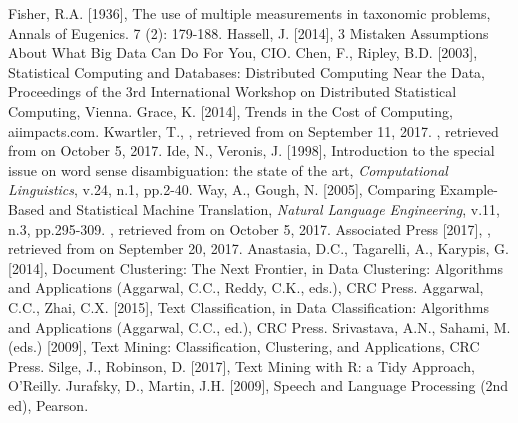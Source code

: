 \begin{thebibliography}{99}
 
 Fisher, R.A. [1936], The use of multiple measurements in taxonomic problems, Annals of Eugenics. 7 (2): 179-188.
 Hassell, J. [2014], 3 Mistaken Assumptions About What Big Data Can Do For You, CIO.
 Chen, F., Ripley, B.D. [2003], Statistical Computing and Databases: Distributed Computing Near the Data, Proceedings of the 3rd International Workshop on Distributed Statistical Computing, Vienna. 
 Grace, K. [2014], Trends in the Cost of Computing, aiimpacts.com.
 Kwartler, T., , retrieved from  on September 11, 2017. 
 , retrieved from  on October 5, 2017.
 Ide, N., Veronis, J. [1998], Introduction to the special issue on word sense disambiguation: the state of the art, \textit{Computational Linguistics}, v.24, n.1, pp.2-40.
 Way, A., Gough, N. [2005], Comparing Example-Based and Statistical Machine Translation, \textit{Natural Language Engineering}, v.11, n.3, pp.295-309.%
 , retrieved from  on October 5, 2017.
 Associated Press [2017], , retrieved from  on September 20, 2017. 
 Anastasia, D.C., Tagarelli, A., Karypis, G. [2014], Document Clustering: The Next Frontier, in Data Clustering: Algorithms and Applications (Aggarwal, C.C., Reddy, C.K., eds.), CRC Press.
 Aggarwal, C.C., Zhai, C.X. [2015], Text Classification, in Data Classification: Algorithms and Applications (Aggarwal, C.C., ed.), CRC Press.
 Srivastava, A.N., Sahami, M. (eds.) [2009], Text Mining: Classification, Clustering, and Applications, CRC Press.
 Silge, J., Robinson, D. [2017], Text Mining with R: a Tidy Approach, O'Reilly.
 Jurafsky, D., Martin, J.H. [2009], Speech and Language Processing (2nd ed), Pearson.

\end{thebibliography}
